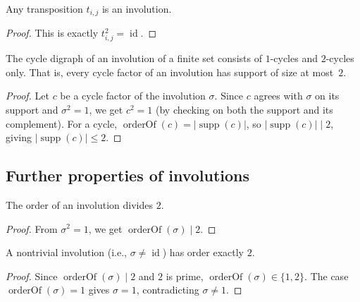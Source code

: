 \begin{lemma}
\label{lem.perm.invol.transposition}
\leanhelper
\leanok
Any transposition $t_{i,j}$ is an involution.
\end{lemma}

\begin{proof}
\leanok
This is exactly $t_{i,j}^2 = \operatorname{id}$.
\end{proof}

\begin{lemma}
\label{lem.perm.invol.cycle_structure}
\leanhelper
\leanok
The cycle digraph of an involution of a finite set consists of $1$-cycles and
$2$-cycles only.  That is, every cycle factor of an involution has support of
size at most~$2$.
\end{lemma}

\begin{proof}
\leanok
Let $c$ be a cycle factor of the involution $\sigma$.
Since $c$ agrees with $\sigma$ on its support and $\sigma^2 = 1$,
we get $c^2 = 1$ (by checking on both the support and its complement).
For a cycle, $\operatorname{orderOf}(c) = |{\operatorname{supp}(c)}|$,
so $|{\operatorname{supp}(c)}| \mid 2$, giving
$|{\operatorname{supp}(c)}| \le 2$.
\end{proof}

\subsection{Further properties of involutions}

\begin{lemma}
\label{lem.perm.invol.orderOf_dvd_two}
\leanhelper
\leanok
The order of an involution divides $2$.
\end{lemma}

\begin{proof}
\leanok
From $\sigma^2 = 1$, we get $\operatorname{orderOf}(\sigma) \mid 2$.
\end{proof}

\begin{lemma}
\label{lem.perm.invol.orderOf_eq_two}
\leanhelper
\leanok
A nontrivial involution (i.e., $\sigma \ne \operatorname{id}$) has order exactly $2$.
\end{lemma}

\begin{proof}
\leanok
Since $\operatorname{orderOf}(\sigma) \mid 2$ and $2$ is prime,
$\operatorname{orderOf}(\sigma) \in \{1, 2\}$.
The case $\operatorname{orderOf}(\sigma) = 1$ gives $\sigma = 1$, contradicting $\sigma \ne 1$.
\end{proof}

